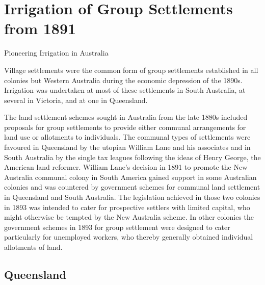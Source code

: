 
\setcounter{endnote}{0}

\chapter{Irrigation of Group Settlements from 1891}
\label{ch:groups}
%
{Pioneering Irrigation in Australia}

Village settlements were the common form of group settlements
established in all colonies but Western Australia during the economic
depression of the 1890s.  Irrigation was undertaken at most of these
settlements in South Australia, at several in Victoria, and at one in
Queensland.

The land settlement schemes sought in Australia from the late 1880s
included proposals for group settlements to provide either communal
arrangements for land use or allotments to individuals.  The communal
types of settlements were favoured in Queensland by the utopian
William Lane  and his associates and in South
Australia by the single tax leagues following the ideas of Henry
George,  the American land reformer.  William Lane's
decision in 1891 to promote the New Australia communal colony in South
America gained support in some Australian colonies and was countered
by government schemes for communal land settlement in Queensland and
South Australia.  The legislation achieved in those two colonies in
1893 was intended to cater for prospective settlers with limited
capital, who might otherwise be tempted by the New Australia scheme.
In other colonies the government schemes in 1893 for group settlement
were designed to cater particularly for unemployed workers, who
thereby generally obtained individual allotments of land.

\section*{Queensland}

